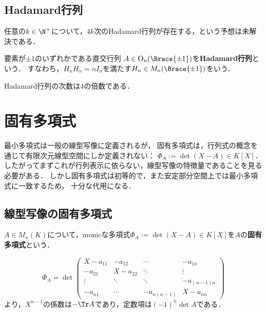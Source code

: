 \documentclass[uplatex, dvipdfmx]{jsreport}
\begin{document}
\subsection{Hadamard行列}

\begin{tcolorbox}[colframe=ForestGreen, colback=ForestGreen!10!white,breakable,colbacktitle=ForestGreen!40!white,coltitle=black,fonttitle=\bfseries\sffamily,
title=]
    任意の$k\in\N^+$について，$4k$次のHadamard行列が存在する，という予想は未解決である．
\end{tcolorbox}

\begin{definition}
    要素が$\pm1$のいずれかである直交行列
    $A\in\mathrm{O}_n(\Brace{\pm1})$を\textbf{Hadamard行列}という．
    すなわち，$H_nH_n=nI_n$を満たす$H_n\in M_n(\Brace{\pm1})$をいう．
\end{definition}

\begin{proposition}
    Hadamard行列の次数は4の倍数である．
\end{proposition}

\section{固有多項式}

\begin{tcolorbox}[colframe=ForestGreen, colback=ForestGreen!10!white, breakable]
    最小多項式は一般の線型写像に定義されるが，
    固有多項式は，行列式の概念を通じて有限次元線型空間にしか定義されない：
    $\Phi_A:=\det(X-A)\in K[X]$．
    したがってまずこれが行列表示に依らない，線型写像の特徴量であることを見る必要がある．
    しかし固有多項式は初等的で，また安定部分空間上では最小多項式に一致するため，
    十分な代用になる．
\end{tcolorbox}

\subsection{線型写像の固有多項式}

\begin{definition}
    $A\in M_n(K)$について，monicな多項式$\Phi_A:=\det(X-A)\in K[X]$を$A$の\textbf{固有多項式}という．
\end{definition}

\begin{remark}[固有方程式の最高次係数と定数項としての特徴付け]
    \[ \Phi_A=\det\begin{pmatrix}X-a_{11}&-a_{12}&\cdots&-a_{1n}\\-a_{21}&X-a_{22}&\ddots&\vdots\\\vdots&\ddots&\ddots&-a_{(n-1)n}\\-a_{n1}&\cdots&-a_{n(n-1)}&X-a_{nn}\end{pmatrix} \]
    より，$X^{n-1}$の係数は$-\Tr A$であり，定数項は$(-1)^n\det A$である．
\end{remark}
\end{document}
